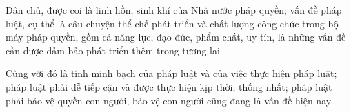 Dân chủ, được coi là linh hồn, sinh khí của Nhà nước pháp quyền; vấn đề pháp luật, cụ thể là câu chuyện thể chế phát triển và chất lượng công chức trong bộ máy pháp quyền, gồm cả năng lực, đạo đức, phẩm chất, uy tín, là những vấn đề cần được đảm bảo phát triển thêm trong tương lai

Cùng với đó là tính minh bạch của pháp luật và của việc thực hiện pháp luật; pháp luật phải dễ tiếp cận và được thực hiện kịp thời, thống nhất; pháp luật phải bảo vệ quyền con người, bảo vệ con người cũng đang là vấn đề hiện nay

\clearpage